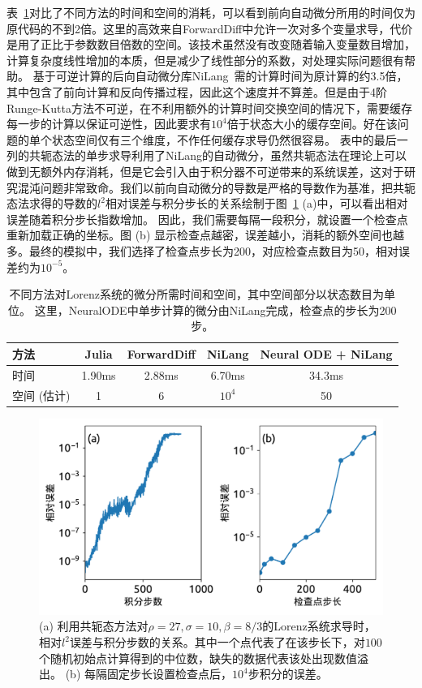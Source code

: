 \documentclass[A4,twoside,UTF8]{ctexart}
\begin{document}
表~\ref{tbl:lorenztiming}对比了不同方法的时间和空间的消耗，可以看到前向自动微分所用的时间仅为原代码的不到2倍。这里的高效来自ForwardDiff中允许一次对多个变量求导，代价是用了正比于参数数目倍数的空间。该技术虽然没有改变随着输入变量数目增加，计算复杂度线性增加的本质，但是减少了线性部分的系数，对处理实际问题很有帮助。
基于可逆计算的后向自动微分库NiLang~\cite{Liu2020b}需的计算时间为原计算的约3.5倍，其中包含了前向计算和反向传播过程，因此这个速度并不算差。但是由于4阶Runge-Kutta方法不可逆，在不利用额外的计算时间交换空间的情况下，需要缓存每一步的计算以保证可逆性，因此要求有$10^4$倍于状态大小的缓存空间。好在该问题的单个状态空间仅有三个维度，不作任何缓存求导仍然很容易。
表中的最后一列的共轭态法的单步求导利用了NiLang的自动微分，虽然共轭态法在理论上可以做到无额外内存消耗，但是它会引入由于积分器不可逆带来的系统误差，这对于研究混沌问题非常致命。我们以前向自动微分的导数是严格的导数作为基准，把共轭态法求得的导数的$l^2$相对误差与积分步长的关系绘制于图~\ref{fig:neuralode-error} (a)中，可以看出相对误差随着积分步长指数增加。
因此，我们需要每隔一段积分，就设置一个检查点重新加载正确的坐标。图 (b) 显示检查点越密，误差越小，消耗的额外空间也越多。最终的模拟中，我们选择了检查点步长为200，对应检查点数目为50，相对误差约为$10^{-5}$。

\begin{table}\centering
    \begin{tabularx}{0.8\textwidth}{Xcccc}\toprule
        方法 & Julia & ForwardDiff & NiLang & Neural ODE + NiLang\\
        \hline
        时间          & 1.90ms   &  2.88ms & 6.70ms & 34.3ms\\  %
        空间 (估计)          & 1   &  6 & $10^4$ & 50\\  %
        \bottomrule
    \end{tabularx}
    \caption{不同方法对Lorenz系统的微分所需时间和空间，其中空间部分以状态数目为单位。
    这里，NeuralODE中单步计算的微分由NiLang完成，检查点的步长为200步。}\label{tbl:lorenztiming}
\end{table}

\begin{figure}[t]
\centering
\includegraphics[width=0.6\columnwidth]{./fig2.pdf}
    \caption{(a) 利用共轭态方法对$\rho=27, \sigma=10, \beta=8/3$的Lorenz系统求导时，相对$l^2$误差与积分步数的关系。其中一个点代表了在该步长下，对$100$个随机初始点计算得到的中位数，缺失的数据代表该处出现数值溢出。 (b) 每隔固定步长设置检查点后，$10^4$步积分的误差。\label{fig:neuralode-error}}
\end{figure}
\end{document}

